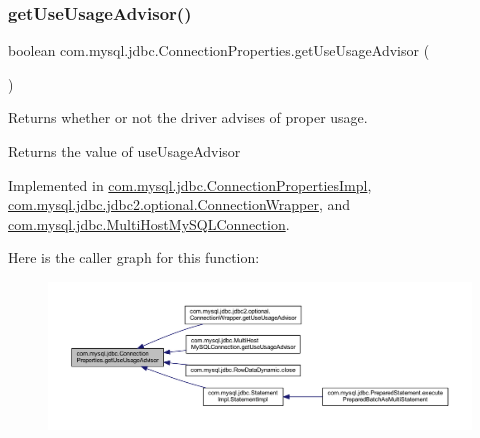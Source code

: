 \subsubsection{\texorpdfstring{get\+Use\+Usage\+Advisor()}{getUseUsageAdvisor()}}
{\footnotesize\ttfamily boolean com.\+mysql.\+jdbc.\+Connection\+Properties.\+get\+Use\+Usage\+Advisor (\begin{DoxyParamCaption}{ }\end{DoxyParamCaption})}

Returns whether or not the driver advises of proper usage.

\begin{DoxyReturn}{Returns}
the value of use\+Usage\+Advisor 
\end{DoxyReturn}


Implemented in \mbox{\hyperlink{classcom_1_1mysql_1_1jdbc_1_1_connection_properties_impl_a9b3b207c5c07bd5443fb9788dc800539}{com.\+mysql.\+jdbc.\+Connection\+Properties\+Impl}}, \mbox{\hyperlink{classcom_1_1mysql_1_1jdbc_1_1jdbc2_1_1optional_1_1_connection_wrapper_a7d80daca8afe93680ae9cff38bd9e287}{com.\+mysql.\+jdbc.\+jdbc2.\+optional.\+Connection\+Wrapper}}, and \mbox{\hyperlink{classcom_1_1mysql_1_1jdbc_1_1_multi_host_my_s_q_l_connection_a713344936008f7ef2eefecaec2aa5754}{com.\+mysql.\+jdbc.\+Multi\+Host\+My\+S\+Q\+L\+Connection}}.

Here is the caller graph for this function\+:\nopagebreak
\begin{figure}[H]
\begin{center}
\leavevmode
\includegraphics[width=350pt]{interfacecom_1_1mysql_1_1jdbc_1_1_connection_properties_ac3d940436d5babe33067c3f75817e9a9_icgraph}
\end{center}
\end{figure}
\mbox{\label{interfacecom_1_1mysql_1_1jdbc_1_1_connection_properties_a1101064e308d3d8aabe9560851a5d6b6}} 
